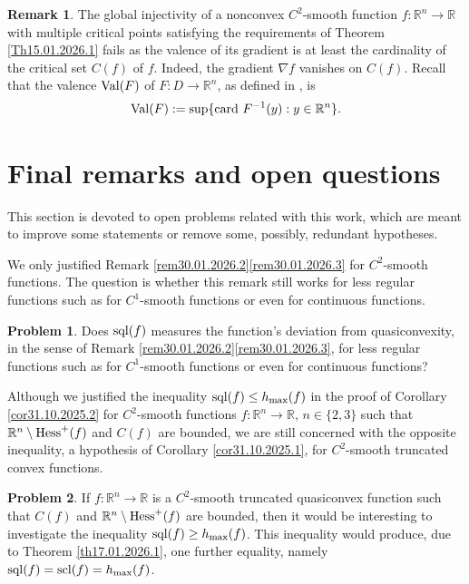 \documentclass[12pt,twoside,reqno]{amsart}
\theoremstyle{definition}
\newtheorem{remark}{Remark}[section]
\newtheorem{problem}{Problem}[section]
\numberwithin{equation}{section}
\begin{document}
\begin{remark}\label{Rem15.01.2026.1}
The global injectivity of a nonconvex $C^2$-smooth function $f:\mathbb{R}^n\longrightarrow\mathbb{R}$ with multiple critical points satisfying the requirements of 
Theorem \ref{Th15.01.2026.1} fails as the valence of its gradient is at least the cardinality of the critical set $C(f)$ of $f$. Indeed,
the gradient $\nabla f$ vanishes on $C(f)$. Recall that the valence ${\rm Val}(F)$ of  $F : D \longrightarrow \mathbb{R}^n$, as defined in \cite{Neumann}, 
is \[{\rm Val}(F):=\sup\{{\rm card}~F^{-1}(y) : y \in \mathbb{R}^n \}.\]
\end{remark}
\section{Final remarks and open questions}
This section is devoted to open problems related with this work, which are meant to improve some statements or remove some, possibly, redundant hypotheses. 

We only justified Remark \ref{rem30.01.2026.2}\eqref{rem30.01.2026.3} for $C^2$-smooth functions. The question is whether this remark still works for less regular functions such as for $C^1$-smooth functions or even for continuous functions.
\begin{problem}\label{Prob30.01.2026.0}
Does ${\rm sql}(f)$ measures the function's deviation from quasiconvexity, in the sense of Remark \ref{rem30.01.2026.2}\eqref{rem30.01.2026.3}, for less regular functions such as for $C^1$-smooth functions or even for continuous functions?
\end{problem}
Although we justified the inequality ${\rm sql}(f)\leq h_{\max}(f)$ in the proof of Corollary \ref{cor31.10.2025.2} for $C^2$-smooth  functions 
$f:\mathbb{R}^n\longrightarrow\mathbb{R}$, $n\in\{2,3\}$ such that $\mathbb{R}^n\setminus {\rm Hess}^+(f)$ and $C(f)$ are bounded, we are still 
concerned with the opposite inequality, a hypothesis of Corollary \ref{cor31.10.2025.1}, for $C^2$-smooth truncated convex functions.
\begin{problem}\label{Prob15.01.2026.0}
If $f:\mathbb{R}^n\longrightarrow\mathbb{R}$ is a $C^2$-smooth truncated quasiconvex function such that $C(f)$ and $\mathbb{R}^n\setminus {\rm Hess}^+(f)$ are bounded, then it would be interesting to investigate the inequality ${\rm sql}(f)\geq h_{\max}(f)$. This inequality would produce, due to Theorem \ref{th17.01.2026.1}, 
one further equality, namely ${\rm sql}(f)= {\rm scl}(f)=h_{\max}(f)$.
\end{problem}
\end{document}

